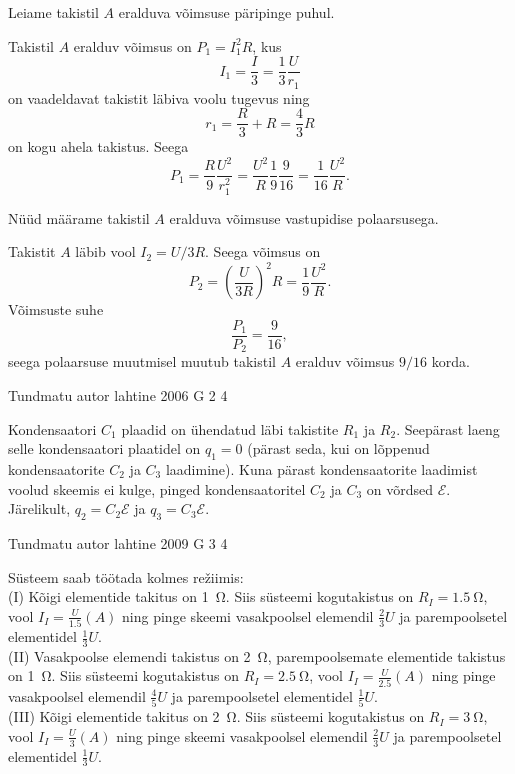 \documentclass[11pt]{article}
\begin{document}
{{Leiame takistil $A$ eralduva võimsuse päripinge puhul. 

Takistil $A$ eralduv võimsus on $P_1 = I_1^2R$, kus
\[
I_1 = \frac{I}{3} = \frac{1}{3} \frac{U}{r_1}
\]
on vaadeldavat takistit läbiva voolu tugevus ning
\[
r_1 = \frac{R}{3} + R = \frac{4}{3} R
\]
on kogu ahela takistus. Seega
\[
P_1=\frac{R}{9} \frac{U^{2}}{r_{1}^{2}}=\frac{U^{2}}{R} \frac{1}{9} \frac{9}{16}=\frac{1}{16} \frac{U^{2}}{R}.
\]

Nüüd määrame takistil $A$ eralduva võimsuse vastupidise polaarsusega. 

Takistit $A$ läbib vool $I_2 = U/3R$. Seega võimsus on
\[
P_{2}=\left(\frac{U}{3 R}\right)^{2} R=\frac{1}{9} \frac{U^{2}}{R}.
\]
Võimsuste suhe
\[
\frac{P_1}{P_2} = \frac{9}{16},
\]
seega polaarsuse muutmisel muutub takistil $A$ eralduv võimsus $9/16$ korda.
\fi
}

{Tundmatu autor} %
{lahtine} %
{2006} %
{G 2} %
{4} %
{

\ifSolution
Kondensaatori $C_1$ plaadid on ühendatud läbi takistite $R_1$ ja $R_2$. Seepärast laeng selle kondensaatori plaatidel on $q_1 = 0$ (pärast seda, kui on lõppenud kondensaatorite $C_2$ ja $C_3$ laadimine). Kuna pärast kondensaatorite laadimist voolud skeemis ei kulge, pinged kondensaatoritel $C_2$ ja $C_3$ on võrdsed $\mathcal E$. Järelikult, $q_2 = C_2\mathcal E$ ja $q_3 = C_3\mathcal E$. 
\fi
}

{Tundmatu autor} %
{lahtine} %
{2009} %
{G 3} %
{4} %
{

\ifSolution
Süsteem saab töötada kolmes režiimis:\\
(I) Kõigi elementide takitus on \SI{1}{\ohm}. Siis süsteemi kogutakistus on $R_I = \SI{1,5}{\ohm}$, vool $I_I = \frac{U}{\num{1,5}}(\si{A})$ ning pinge skeemi vasakpoolsel elemendil $\frac{2}{3}U$ ja parempoolsetel elementidel $\frac 13U$.\\
(II) Vasakpoolse elemendi takistus on \SI{2}{\ohm}, parempoolsemate elementide takistus on \SI{1}{\ohm}. Siis süsteemi kogutakistus on $R_I = \SI{2,5}{\ohm}$, vool $I_I = \frac{U}{\num{2,5}}(\si{A})$ ning pinge vasakpoolsel elemendil $\frac 45U$ ja parempoolsetel elementidel $\frac 15U$.\\
(III) Kõigi elementide takitus on \SI{2}{\ohm}. Siis süsteemi kogutakistus on $R_I = \SI{3}{\ohm}$, vool $I_I = \frac U3(A)$ ning pinge skeemi vasakpoolsel elemendil $\frac 23U$ ja parempoolsetel elementidel $\frac 13U$.

}}
\end{document}
